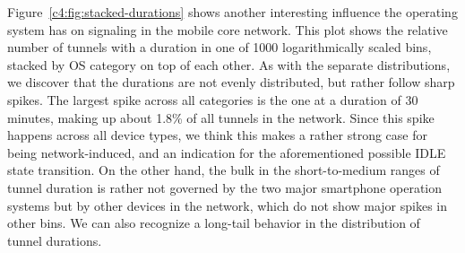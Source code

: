 Figure~\ref{c4:fig:stacked-durations} shows another interesting influence the operating system has on signaling in the mobile core network. This plot shows the relative number of tunnels with a duration in one of 1000 logarithmically scaled bins, stacked by OS category on top of each other. As with the separate distributions, we discover that the durations are not evenly distributed, but rather follow sharp spikes. The largest spike across all categories is the one at a duration of 30 minutes, making up about 1.8\% of all tunnels in the network. Since this spike happens across all device types, we think this makes a rather strong case for being network-induced, and an indication for the aforementioned possible IDLE state transition. On the other hand, the bulk in the short-to-medium ranges of tunnel duration is rather not governed by the two major smartphone operation systems but by other devices in the network, which do not show major spikes in other bins. We can also recognize a long-tail behavior in the distribution of tunnel durations.






